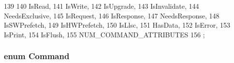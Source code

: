 \begin{DoxyCode}
139     {
140         IsRead,         
141         IsWrite,        
142         IsUpgrade,
143         IsInvalidate,
144         NeedsExclusive, 
145         IsRequest,      
146         IsResponse,     
147         NeedsResponse,  
148         IsSWPrefetch,
149         IsHWPrefetch,
150         IsLlsc,         
151         HasData,        
152         IsError,        
153         IsPrint,        
154         IsFlush,        
155         NUM_COMMAND_ATTRIBUTES
156     };
\end{DoxyCode}
\hypertarget{classMemCmd_a2afce0a47a93eee73a314d53e4890153}{
\subsubsection[{Command}]{\setlength{\rightskip}{0pt plus 5cm}enum {\bf Command}}}
\label{classMemCmd_a2afce0a47a93eee73a314d53e4890153}

